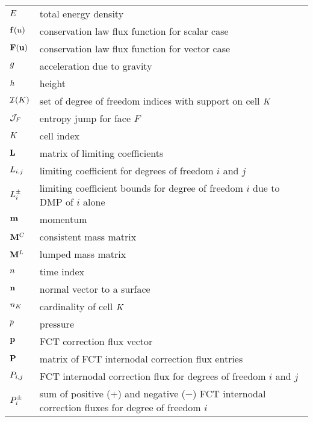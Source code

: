 \begin{center}
\begin{longtable}{l p{4.8in}}
$E$     & total energy density\\
$\mathbf{f}(u)$  & conservation law flux function for scalar case\\
$\consfluxvector$  & conservation law flux function for vector case\\
$g$         & acceleration due to gravity\\
$h$          & height\\
$\indicescell$     & set of degree of freedom indices with support on
                     cell $K$\\
$\mathcal{J}_F$ & entropy jump for face $F$\\
$K$       & cell index\\

$\mathbf{L}$   & matrix of limiting coefficients\\
$L_{i,j}$ & limiting coefficient for degrees of freedom $i$
                         and $j$\\
$L^\pm_i$ & limiting coefficient bounds for degree of freedom $i$
                         due to DMP of $i$ alone\\
$\mathbf{m}$        & momentum\\
$\mathbf{M}^C$ & consistent mass matrix\\
$\mathbf{M}^L$ & lumped mass matrix\\

$n$       & time index\\
$\mathbf{n}$    & normal vector to a surface\\
$\cardinality$     & cardinality of cell $K$\\
$p$        & pressure\\
$\mathbf{p}$ & FCT correction flux vector\\
$\correctionfluxmatrix$ & matrix of FCT internodal correction flux entries\\
$\correctionfluxij$ & FCT internodal correction flux for degrees of freedom
                      $i$ and $j$\\
$\correctionfluxsumsi$ & sum of positive ($+$) and negative ($-$) FCT internodal
                         correction fluxes for degree of freedom $i$\\


\end{longtable}
\end{center}
